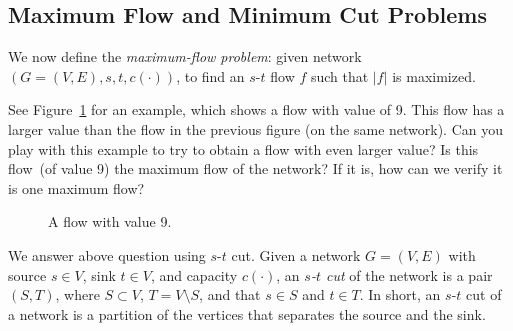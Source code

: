 \subsection*{Maximum Flow and Minimum Cut Problems}

We now define the \emph{maximum-flow problem}: given network $(G= (V, E), s, t, c(\cdot))$,
to find an $s$-$t$ flow $f$ such that $|f|$ is maximized.

See Figure~\ref{fig:maxflow} for an example, which shows a flow with value of 9. 
This flow has a larger value than the flow in the previous figure (on the same network). 
Can you play with this example to try to obtain a flow with even larger value?
Is this flow~(of value 9) the maximum flow of the network?
If it is, how can we verify it is one maximum flow?


\begin{figure}[h]
\centering{}
\caption{A flow with value 9.} %
\label{fig:maxflow}
\end{figure}



We answer above question using $s$-$t$ cut.
Given a network $G=(V, E)$ with source $s\in V$, sink $t\in V$, and capacity $c(\cdot)$,
an \emph{$s$-$t$ cut} of the network is a pair $(S, T)$, where $S\subset V$, $T = V\setminus S$,
and that $s\in S$ and $t\in T$. In short, an $s$-$t$ cut of a network is a partition
of the vertices that separates the source and the sink.

